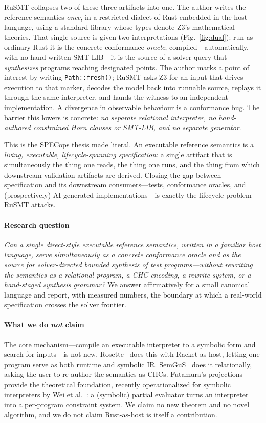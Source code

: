 \documentclass[sigplan,review,anonymous]{acmart}
\theoremstyle{definition}
\theoremstyle{remark}
\newcommand{\rusmt}{RuSMT}
\newcommand{\code}[1]{\texttt{#1}}
\begin{document}
\rusmt{} collapses two of these three artifacts into one. The author writes the
reference semantics \emph{once}, in a restricted dialect of Rust embedded in the
host language, using a standard library whose types denote Z3's mathematical
theories. That single source is given two interpretations
(Fig.~\ref{fig:dual}): run as ordinary Rust it is the concrete conformance
\emph{oracle}; compiled---automatically, with no hand-written SMT-LIB---it is the
source of a solver query that \emph{synthesizes} programs reaching designated
points. The author marks a point of interest by writing \code{Path::fresh()};
\rusmt{} asks Z3 for an input that drives execution to that marker, decodes the
model back into runnable source, replays it through the same interpreter, and
hands the witness to an independent implementation. A divergence in observable
behaviour is a conformance bug. The barrier this lowers is concrete: \emph{no
separate relational interpreter, no hand-authored constrained Horn clauses or
SMT-LIB, and no separate generator}.

This is the SPECops thesis made literal. An executable reference semantics is a
\emph{living, executable, lifecycle-spanning specification}: a single artifact
that is simultaneously the thing one reads, the thing one runs, and the thing
from which downstream validation artifacts are derived. Closing the gap between
specification and its downstream consumers---tests, conformance oracles, and
(prospectively) AI-generated implementations---is exactly the lifecycle problem
\rusmt{} attacks.

\paragraph{Research question}
\emph{Can a single direct-style executable reference semantics, written in a
familiar host language, serve simultaneously as a concrete conformance oracle and
as the source for solver-directed bounded synthesis of test programs---without
rewriting the semantics as a relational program, a CHC encoding, a rewrite
system, or a hand-staged synthesis grammar?} We answer affirmatively for a small
canonical language and report, with measured numbers, the boundary at which a
real-world specification crosses the solver frontier.

\paragraph{What we do \emph{not} claim}
The core mechanism---compile an executable interpreter to a symbolic form and
search for inputs---is not new. Rosette~\cite{torlak2013rosette,torlak2014rosette}
does this with Racket as host, letting one program serve as both runtime and
symbolic IR. SemGuS~\cite{kim2021semgus} does it relationally, asking the user to
re-author the semantics as CHCs. Futamura's
projections~\cite{futamura1999partial} provide the theoretical foundation,
recently operationalized for symbolic interpreters by Wei et
al.~\cite{wei2020gensym}: a (symbolic) partial evaluator turns an interpreter
into a per-program constraint system. We claim no new theorem and no novel
algorithm, and we do not claim Rust-as-host is itself a contribution.
\end{document}
